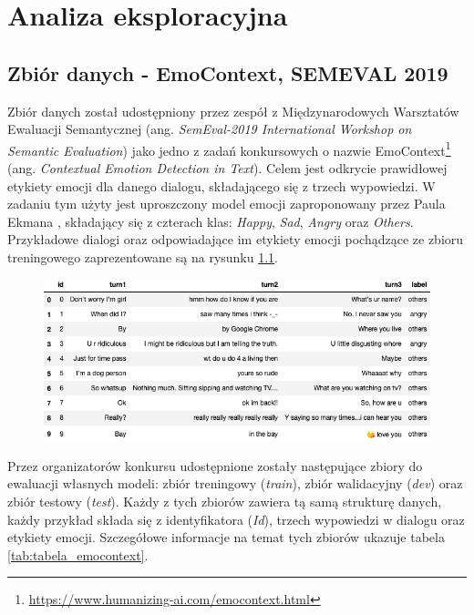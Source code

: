 \chapter{Analiza eksploracyjna}

\section{Zbiór danych - EmoContext, SEMEVAL 2019}

Zbiór danych został udostępniony przez zespół z Międzynarodowych Warsztatów Ewaluacji Semantycznej (ang. \textit{SemEval-2019 International Workshop on Semantic Evaluation}) jako jedno z zadań konkursowych o nazwie EmoContext\footnote{\url{https://www.humanizing-ai.com/emocontext.html}} (ang. \textit{Contextual Emotion Detection in Text}).  Celem jest odkrycie prawidłowej etykiety emocji dla danego dialogu, składającego się z trzech wypowiedzi. W zadaniu tym użyty jest uproszczony model emocji zaproponowany przez Paula Ekmana \cite{ekman1993facial}, składający się z czterach klas: \textit{Happy}, \textit{Sad}, \textit{Angry} oraz \textit{Others}. Przykładowe dialogi oraz odpowiadające im etykiety emocji pochądzące ze zbioru treningowego zaprezentowane są na rysunku \ref{rys:examples_semeval}.

\begin{figure}[h]
\centering\includegraphics[width=12cm]{figures/examples_semeval.png}
\label{rys:examples_semeval}
\end{figure}

Przez organizatorów konkursu udostępnione zostały następujące zbiory do ewaluacji własnych modeli: zbiór treningowy (\textit{train}), zbiór walidacyjny (\textit{dev}) oraz zbiór testowy (\textit{test}). Każdy z tych zbiorów zawiera tą samą strukturę danych, każdy przykład składa się z identyfikatora (\textit{Id}), trzech wypowiedzi w dialogu oraz etykiety emocji. Szczegółowe informacje na temat tych zbiorów ukazuje tabela \ref{tab:tabela_emocontext}.

